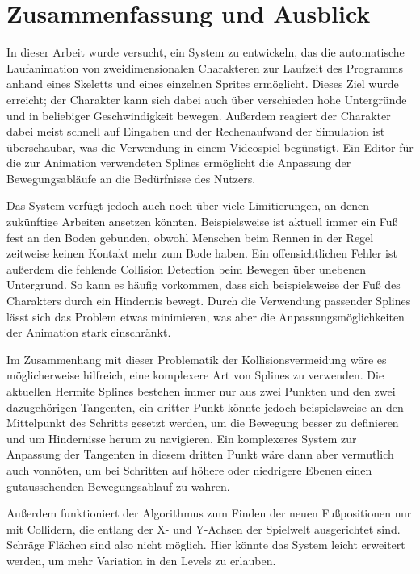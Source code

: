 \chapter{Zusammenfassung und Ausblick} \label{zusammenfassung}
In dieser Arbeit wurde versucht, ein System zu entwickeln, das die automatische Laufanimation von zweidimensionalen Charakteren zur Laufzeit des Programms anhand eines Skeletts und eines einzelnen Sprites ermöglicht. Dieses Ziel wurde erreicht; der Charakter kann sich dabei auch über verschieden hohe Untergründe und in beliebiger Geschwindigkeit bewegen. Außerdem reagiert der Charakter dabei meist schnell auf Eingaben und der Rechenaufwand der Simulation ist überschaubar, was die Verwendung in einem Videospiel begünstigt. Ein Editor für die zur Animation verwendeten Splines ermöglicht die Anpassung der Bewegungsabläufe an die Bedürfnisse des Nutzers.

Das System verfügt jedoch auch noch über viele Limitierungen, an denen zukünftige Arbeiten ansetzen könnten. Beispielsweise ist aktuell immer ein Fuß fest an den Boden gebunden, obwohl Menschen beim Rennen in der Regel zeitweise keinen Kontakt mehr zum Bode haben. Ein offensichtlichen Fehler ist außerdem die fehlende Collision Detection beim Bewegen über unebenen Untergrund. So kann es häufig vorkommen, dass sich beispielsweise der Fuß des Charakters durch ein Hindernis bewegt. Durch die Verwendung passender Splines lässt sich das Problem etwas minimieren, was aber die Anpassungsmöglichkeiten der Animation stark einschränkt.

Im Zusammenhang mit dieser Problematik der Kollisionsvermeidung wäre es möglicherweise hilfreich, eine komplexere Art von Splines zu verwenden. Die aktuellen Hermite Splines bestehen immer nur aus zwei Punkten und den zwei dazugehörigen Tangenten, ein dritter Punkt könnte jedoch beispielsweise an den Mittelpunkt des Schritts gesetzt werden, um die Bewegung besser zu definieren und um Hindernisse herum zu navigieren. Ein komplexeres System zur Anpassung der Tangenten in diesem dritten Punkt wäre dann aber vermutlich auch vonnöten, um bei Schritten auf höhere oder niedrigere Ebenen einen gutaussehenden Bewegungsablauf zu wahren.

Außerdem funktioniert der Algorithmus zum Finden der neuen Fußpositionen nur mit Collidern, die entlang der X- und Y-Achsen der Spielwelt ausgerichtet sind. Schräge Flächen sind also nicht möglich. Hier könnte das System leicht erweitert werden, um mehr Variation in den Levels zu erlauben.




